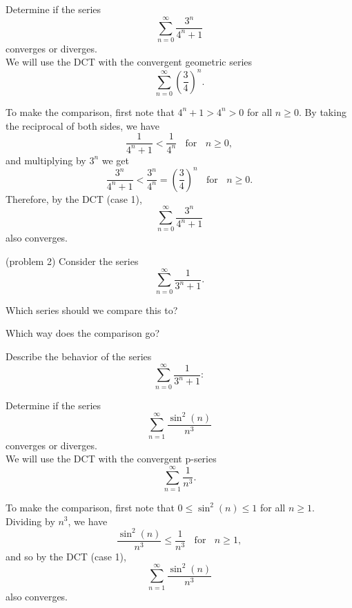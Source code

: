 \documentclass{ximera}
\begin{document}
\begin{example}[example 2] %
Determine if the series 
\[
\sum_{n=0}^\infty \frac{3^n}{4^n + 1}
\]
 converges or diverges.\\
We will use the DCT with the convergent geometric series 
\[
\sum_{n=0}^\infty \left(\frac34\right)^n.
\]
 
To make the comparison, first note that $4^n + 1 > 4^n > 0$ for all $n \geq 0$. By taking the reciprocal of both sides,
we have 
\[
\frac{1}{4^n + 1} < \frac{1}{4^n} \; \; \text{ for } \;\; n \geq 0,
\]
and multiplying by $3^n$ we get
\[
\frac{3^n}{4^n + 1} < \frac{3^n}{4^n} = \left(\frac34\right)^n \;\; \text{ for } \;\; n \geq 0.
\]
Therefore, by the DCT (case 1), 
\[
\sum_{n=0}^\infty \frac{3^n}{4^n + 1}
\]
 also converges.
\end{example}


\begin{problem}(problem 2)
Consider the series 
\[
\sum_{n=0}^\infty \frac{1}{3^n + 1}.
\]

Which series should we compare this to?

\begin{multipleChoice}
\end{multipleChoice}

Which way does the comparison go?
\begin{multipleChoice}
\end{multipleChoice}

Describe the behavior of the series 
\[
\sum_{n=0}^\infty \frac{1}{3^n + 1}:
\]

\begin{multipleChoice}
\end{multipleChoice}

\end{problem}



\begin{example}[example 3] %
Determine if the series 
\[
\sum_{n=1}^\infty \frac{\sin^2(n)}{n^3}
\]
 converges or diverges.\\
We will use the DCT with the convergent p-series 
\[
\sum_{n=1}^\infty \frac{1}{n^3}.
\]
 
To make the comparison, first note that $0 \leq \sin^2(n) \leq 1$ for all $n \geq 1$. Dividing by $n^3$,
we have 
\[
\frac{\sin^2(n)}{n^3} \leq \frac{1}{n^3} \; \; \text{ for } \; \; n \geq 1,
\]
and so by the DCT (case 1), 
\[
\sum_{n=1}^\infty \frac{\sin^2(n)}{n^3}
\]
 also converges.
\end{example}
\end{document}
